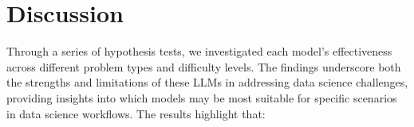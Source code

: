 \documentclass[conference]{IEEEtran}
\begin{document}


\section{Discussion} \label{sec:dicussion}
Through a series of hypothesis tests, we investigated each model's effectiveness across different problem types and difficulty levels. The findings underscore both the strengths and limitations of these LLMs in addressing data science challenges, providing insights into which models may be most suitable for specific scenarios in data science workflows. The results highlight that:
\end{document}
